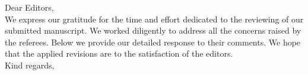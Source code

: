 Dear Editors,%
\\[2em]
We express our gratitude for the time and effort dedicated to the reviewing of our submitted manuscript. We worked diligently to address all the concerns raised by the referees. Below we provide our detailed response to their comments.
We hope that the applied revisions are to the satisfaction of the editors.
\\[2em]
Kind regards,
\begin{flushright}
\AuthorsInLetter
\end{flushright}
